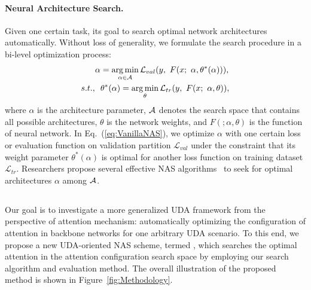 \documentclass[10pt,twocolumn,letterpaper]{article}
\begin{document}
\vspace{-4mm}
\paragraph{Neural Architecture Search.}
Given one certain task, its goal to search optimal network architectures automatically. Without loss of generality, we formulate the search procedure in a bi-level optimization process: \begin{equation}
    \begin{split}
        \alpha &= \mathop{\arg \min}_{\alpha \in \mathcal{A}} \mathcal{L}_{val} (y, \  F(x; \  \alpha, \theta^{*}(\alpha))), \\
        s.t., \ \  &\theta^{*}(\alpha) = \mathop{\arg \min}_{\theta} \mathcal{L}_{tr}(y, \  F(x; \  \alpha, \theta)),
    \end{split}
    \label{eq:VanillaNAS}
\end{equation}
where $\alpha$ is the architecture parameter, $\mathcal{A}$ denotes the search space that contains all possible architectures, $\theta$ is the network weights, and $F(; \alpha, \theta)$ is the function of neural network.
In Eq.~(\ref{eq:VanillaNAS}), we optimize $\alpha$ with one certain loss or evaluation function on validation partition $\mathcal{L}_{val}$ under the constraint that its weight parameter $\theta^{*}(\alpha)$ is optimal for another loss function on training dataset $\mathcal{L}_{tr}$.
Researchers propose several effective NAS algorithms~\cite{real2019EvoNAS,zoph2018NASNet,liu2018DARTS} to seek for optimal architectures $\alpha$ among $\mathcal{A}$.











\subsection{\iMethod}
Our goal is to investigate a more generalized UDA framework from the perspective of attention mechanism: automatically optimizing the configuration of attention in backbone networks for one arbitrary UDA scenario. To this end, we propose a new UDA-oriented NAS scheme, termed \iMethod, which searches the optimal attention in the attention configuration search space by employing our search algorithm and evaluation method. The overall illustration of the proposed method is shown in Figure~\ref{fig:Methodology}.
\end{document}
